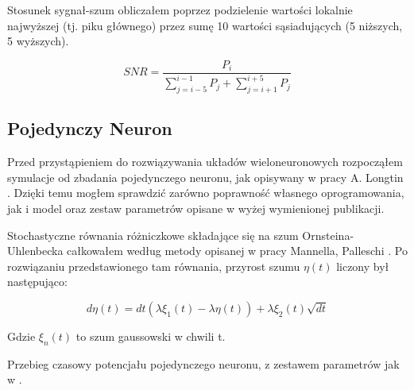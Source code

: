   Stosunek sygnał-szum obliczałem poprzez podzielenie wartości lokalnie najwyższej (tj. piku głównego) przez sumę 10 wartości sąsiadujących (5 niższych, 5 wyższych).

  \begin{equation}
    SNR = \frac{P_i}{\sum\limits^{i-1}_{j=i-5} P_j + \sum\limits^{i+5}_{j=i+1} P_j}
  \end{equation}  
  
  \subsection{Pojedynczy Neuron}
  
  Przed przystąpieniem do rozwiązywania układów wieloneuronowych rozpocząłem symulacje od zbadania pojedynczego neuronu, jak opisywany w pracy A. Longtin \cite{longtin}. Dzięki temu mogłem sprawdzić zarówno poprawność własnego oprogramowania, jak i model oraz zestaw parametrów opisane w wyżej wymienionej publikacji.
  
  Stochastyczne równania różniczkowe składające się na szum Ornsteina-Uhlenbecka całkowałem według metody opisanej w pracy Mannella, Palleschi \cite{mannella}. Po rozwiązaniu przedstawionego tam równania, przyrost szumu $\eta (t)$ liczony był następująco:

  \begin{equation} \label{eq:deta}
    d\eta(t) = dt(\lambda \xi_1(t) - \lambda \eta(t)) + \lambda \xi_2(t) \sqrt{dt}
  \end{equation}

  Gdzie $\xi_n(t)$ to szum gaussowski w chwili t.
  
  Przebieg czasowy potencjału pojedynczego neuronu, z zestawem parametrów jak w \cite{longtin}.
  
